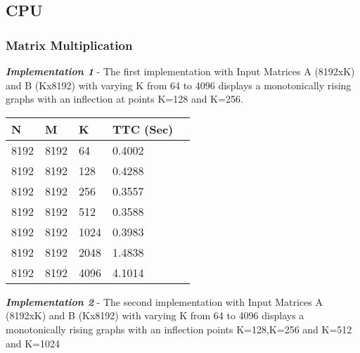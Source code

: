\documentclass[14pt,fleqn]{article}
\begin{document}

\subsection{CPU}
\subsubsection{Matrix Multiplication}
\textit{\textbf{Implementation 1}} - The first implementation with Input Matrices A (8192xK) and B (Kx8192) with varying K from 64 to 4096 displays a monotonically rising graphs with an inflection at points K=128 and K=256.\\

\begin{center}
\begin{tabular}{|l|l|l|l|l|}                                   
    \hline\hline         
    N  & M & K & TTC (Sec) \\
    \hline\hline
    8192 & 8192 & 64 & 0.4002 \\ \hline
    8192 & 8192 & 128 & 0.4288 \\ \hline
    8192 & 8192 & 256 & 0.3557 \\ \hline
    8192 & 8192 & 512 & 0.3588 \\ \hline
    8192 & 8192 & 1024 & 0.3983 \\ \hline
    8192 & 8192 & 2048 & 1.4838 \\ \hline
    8192 & 8192 & 4096 & 4.1014 \\ \hline

\end{tabular}
\end{center}

\textit{\textbf{Implementation 2}} - The second implementation with Input Matrices A (8192xK) and B (Kx8192) with varying K from 64 to 4096 displays a monotonically rising graphs with an inflection points K=128,K=256 and K=512 and K=1024\\
\end{document}

